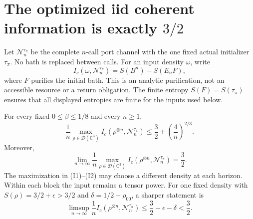 \section{The optimized iid coherent information is exactly \texorpdfstring{$3/2$}{3/2}}
\label{sec:iidinformation}

Let $\mathcal N_n^{\tau_\pi}$ be the complete $n$-call port channel with
the one fixed actual initializer $\tau_\pi$. No bath is replaced between
calls. For an input density $\omega$, write
\[
 I_c(\omega,\mathcal N_n^{\tau_\pi})
 =S(B^n)-S(E_nF),
\]
where $F$ purifies the initial bath. This is an analytic purification,
not an accessible resource or a return obligation. The finite entropy
$S(F)=S(\tau_\pi)$ ensures that all displayed entropies are finite for
the inputs used below.

\begin{theorem}
\label{thm:iidinformation}
For every fixed $0\le\beta\le1/8$ and every $n\ge1$,
\[
 \frac1n\max_{\rho\in\mathcal D(\mathbb C^3)}
 I_c(\rho^{\otimes n},\mathcal N_n^{\tau_\pi})
 \le \frac32+\left(\frac4n\right)^{2/3}.
 \tag{I1}
\]
Moreover,
\[
 \boxed{\displaystyle
 \lim_{n\to\infty}\frac1n\max_{\rho\in\mathcal D(\mathbb C^3)}
 I_c(\rho^{\otimes n},\mathcal N_n^{\tau_\pi})=\frac32.}
 \tag{I2}
\]
The maximization in (I1)--(I2) may choose a different density at each
horizon. Within each block the input remains a tensor power. For one
fixed density with $S(\rho)=3/2+\epsilon>3/2$ and
$\delta=1/2-\rho_{00}$, a sharper statement is
\[
 \limsup_{n\to\infty}\frac1n
 I_c(\rho^{\otimes n},\mathcal N_n^{\tau_\pi})
 \le\frac32-\epsilon-\delta<\frac32.
 \tag{I3}
\]
\end{theorem}
